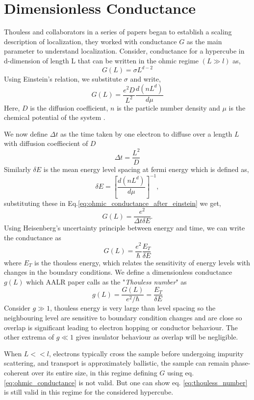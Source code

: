 \section*{Dimensionless Conductance}
Thouless and collaborators in a series of papers began to establish a scaling description of localization, they worked with conductance $G$ as the main parameter to understand localization\cite{Thouless1974,EdwardsThouless1972}. Consider, conductance for a hypercube in d-dimension of length L that can be written in the ohmic regime $(L\gg l)$ as,
\begin{equation}
    G(L)=\sigma L^{d-2}
    \label{eq:ohmic_conductance}
\end{equation}
Using Einstein's relation, we substitute $\sigma$ and write,
\begin{equation}
    G(L)= \frac{e^2D}{L^2} \frac{d(nL^{d})}{d\mu}
    \label{eq:ohmic_conductance_after_einstein}
\end{equation}
Here, $D$ is the diffusion coefficient, $n$ is the particle number density and $\mu$ is the chemical potential of the system \cite{GirvinYang2019}.

We now define $\Delta t$ as the time taken by one electron to diffuse over a length $L$ with diffusion coeffiecient of $D$
\[\Delta t= \frac{L^2}{D}\]
Similarly $\delta E$ is the mean energy level spacing at fermi energy which is defined as,
\begin{equation}
    \delta E =
    \left[
        \frac{d(nL^d)}{d\mu}
    \right]^{-1},
    \label{eq:mean_energy_spacing}
\end{equation}
substituting these in Eq.\ref{eq:ohmic_conductance_after_einstein} we get,
\[
    G(L)= \frac{e^2}{\Delta t\delta E}.
\]
Using Heisenberg's uncertainty principle between energy and time, we can write the conductance as 
\begin{equation}
    G(L)= \frac{e^2}{\hbar}\frac{E_T}{\delta E}
\end{equation}
where $E_T$ is the thouless energy, which relates the sensitivity of energy levels with changes in the boundary conditions.
We define a dimensionless conductance $g(L)$ which AALR paper calls as the "\textit{Thouless number}" as
\begin{equation}
    g(L)=\frac{G(L)}{e^2/\hbar}=\frac{E_T}{\delta E}
    \label{eq:thouless_number}
\end{equation}
Consider $g\gg1$, thouless energy is very large than level spacing so the neighbouring level are sensitive to boundary condition changes and are close so overlap is significant leading to electron hopping or conductor behaviour. The other extrema of $g\ll1$ gives insulator behaviour as overlap will be negligible.

When $L<<l$, electrons typically cross the sample before undergoing impurity scattering, and transport is approximately ballistic, the sample can remain phase-coherent over its entire size, in this regime defining $G$ using eq. \ref{eq:ohmic_conductance} is not valid. But one can show eq. \ref{eq:thouless_number} is still valid in this regime for the considered hypercube\cite{AALR1979,GirvinYang2019}.